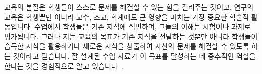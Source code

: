 \documentclass[11pt]{article}
\begin{document}
\begin{spacing}{1.145}
\clearpage
교육의 본질은 학생들이 스스로 문제를 해결할 수 있는 힘을 길러주는 것이고, 연구의 
%
교육은 학생뿐만 아니라 교수, 조교, 학계에도 큰 영향을 미치는 가장 중요한 학술적 활동입니다. 수업에서 학생들은 기존 지식에 직면하며, 그들의 이해는 시험이나 과제로 평가됩니다. 그러나 저는 교육의 목표가 기존 지식을 전달하는 것뿐만 아니라 학생들이 습득한 지식을 활용하거나 새로운 지식을 창출하여 자신의 문제를 해결할 수 있도록 하는 것이라고 믿습니다. 잘 설계된 수업 자료가 이 목표를 달성하는 데 중추적인 역할을 한다는 것을 경험적으로 알고 있습니다~\cite{JeJeChOh17}.



\end{spacing}


\end{document}
